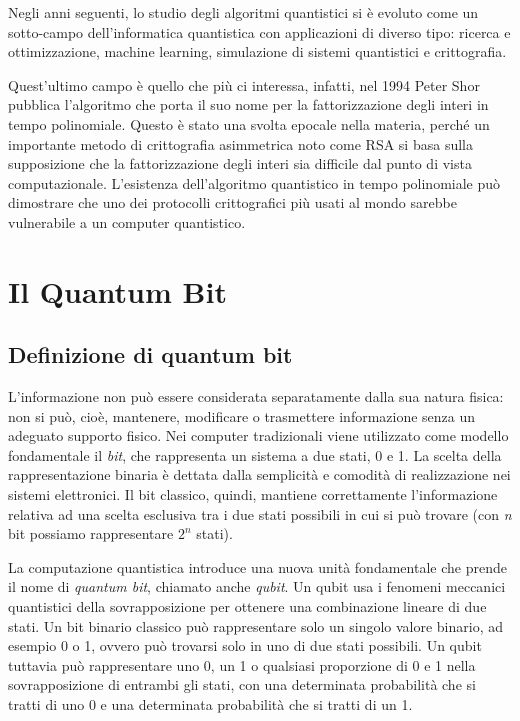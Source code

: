 Negli anni seguenti, lo studio degli algoritmi quantistici si è evoluto come un sotto-campo dell'informatica quantistica con applicazioni di diverso tipo: ricerca e ottimizzazione, machine learning, simulazione di sistemi quantistici e crittografia.

Quest'ultimo campo è quello che più ci interessa, infatti, nel 1994 Peter Shor pubblica l'algoritmo che porta il suo nome per la fattorizzazione degli interi in tempo polinomiale.\cite{breaking-rsa} Questo è stato una svolta epocale nella materia, perché un importante metodo di crittografia asimmetrica noto come RSA si basa sulla supposizione che la fattorizzazione degli interi sia difficile dal punto di vista computazionale. L'esistenza dell'algoritmo quantistico in tempo polinomiale può dimostrare che uno dei protocolli crittografici più usati al mondo sarebbe vulnerabile a un computer quantistico.

\section{Il Quantum Bit}
\subsection{Definizione di quantum bit}
L'informazione non può essere considerata separatamente dalla sua natura fisica: non si può, cioè, mantenere, modificare o trasmettere informazione senza un adeguato supporto fisico. Nei computer tradizionali viene utilizzato come modello fondamentale il \textit{bit}, che rappresenta un sistema a due stati, 0 e 1. La scelta della rappresentazione binaria è dettata dalla semplicità e comodità di realizzazione nei sistemi elettronici. Il bit classico, quindi, mantiene correttamente l'informazione relativa ad una scelta esclusiva tra i due stati possibili in cui si può trovare (con \textit{n} bit possiamo rappresentare \(2^n\) stati).

La computazione quantistica introduce una nuova unità fondamentale che prende il nome di \textit{quantum bit}, chiamato anche \textit{qubit}. Un qubit usa i fenomeni meccanici quantistici della sovrapposizione per ottenere una combinazione lineare di due stati. Un bit binario classico può rappresentare solo un singolo valore binario, ad esempio 0 o 1, ovvero può trovarsi solo in uno di due stati possibili. Un qubit tuttavia può rappresentare uno 0, un 1 o qualsiasi proporzione di 0 e 1 nella sovrapposizione di entrambi gli stati, con una determinata probabilità che si tratti di uno 0 e una determinata probabilità che si tratti di un 1.

